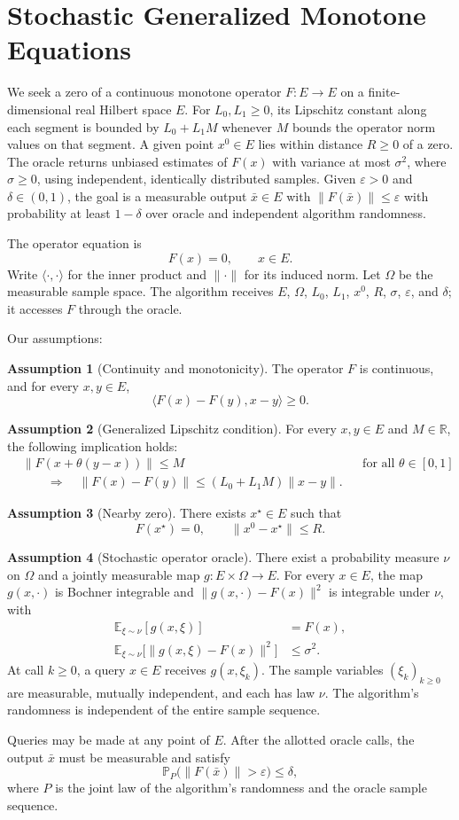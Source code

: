 \documentclass[10pt]{article}
\theoremstyle{definition}
\newtheorem{assumption}{Assumption}
\begin{document}
\section*{Stochastic Generalized Monotone Equations}
We seek a zero of a continuous monotone operator $F:E\to E$ on a finite-dimensional real Hilbert space $E$. For $L_0,L_1\geq0$, its Lipschitz constant along each segment is bounded by $L_0+L_1M$ whenever $M$ bounds the operator norm values on that segment. A given point $x^0\in E$ lies within distance $R\geq0$ of a zero. The oracle returns unbiased estimates of $F(x)$ with variance at most $\sigma^2$, where $\sigma\geq0$, using independent, identically distributed samples. Given $\varepsilon>0$ and $\delta\in(0,1)$, the goal is a measurable output $\bar{x}\in E$ with $\|F(\bar{x})\|\leq\varepsilon$ with probability at least $1-\delta$ over oracle and independent algorithm randomness.

The operator equation is
\[
F(x)=0,\qquad x\in E.
\]
Write $\langle\cdot,\cdot\rangle$ for the inner product and $\|\cdot\|$ for its induced norm. Let $\Omega$ be the measurable sample space. The algorithm receives $E$, $\Omega$, $L_0$, $L_1$, $x^0$, $R$, $\sigma$, $\varepsilon$, and $\delta$; it accesses $F$ through the oracle.

Our assumptions:
\begin{assumption}[Continuity and monotonicity]
The operator $F$ is continuous, and for every $x,y\in E$,
\[
\langle F(x)-F(y),x-y\rangle\geq0.
\]
\end{assumption}

\begin{assumption}[Generalized Lipschitz condition]
For every $x,y\in E$ and $M\in\mathbb{R}$, the following implication holds:
\[
\begin{aligned}
&\|F(x+\theta(y-x))\|\leq M
&&\text{for all }\theta\in[0,1]\\
&\qquad\Longrightarrow\quad
\|F(x)-F(y)\|\leq(L_0+L_1M)\|x-y\|.
\end{aligned}
\]
\end{assumption}

\begin{assumption}[Nearby zero]
There exists $x^\star\in E$ such that
\[
F(x^\star)=0,
\qquad \|x^0-x^\star\|\leq R.
\]
\end{assumption}

\begin{assumption}[Stochastic operator oracle]
There exist a probability measure $\nu$ on $\Omega$ and a jointly measurable map $g:E\times\Omega\to E$. For every $x\in E$, the map $g(x,\cdot)$ is Bochner integrable and $\|g(x,\cdot)-F(x)\|^2$ is integrable under $\nu$, with
\[
\begin{aligned}
\mathbb{E}_{\xi\sim\nu}[g(x,\xi)]&=F(x),\\
\mathbb{E}_{\xi\sim\nu}\bigl[\|g(x,\xi)-F(x)\|^2\bigr]&\leq\sigma^2.
\end{aligned}
\]
At call $k\geq0$, a query $x\in E$ receives $g(x,\xi_k)$. The sample variables $(\xi_k)_{k\geq0}$ are measurable, mutually independent, and each has law $\nu$. The algorithm's randomness is independent of the entire sample sequence.
\end{assumption}

Queries may be made at any point of $E$. After the allotted oracle calls, the output $\bar{x}$ must be measurable and satisfy
\[
\mathbb{P}_{P}\bigl(\|F(\bar{x})\|>\varepsilon\bigr)\leq\delta,
\]
where $P$ is the joint law of the algorithm's randomness and the oracle sample sequence.
\end{document}
